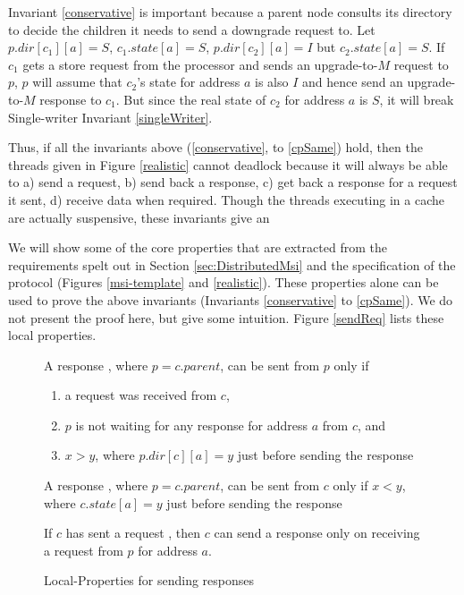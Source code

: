 Invariant \ref{conservative} is important because a parent node consults its
directory to decide the children it needs to send a downgrade request to.  Let
$p.dir[c_1][a] = S$, $c_1.state[a] = S$, $p.dir[c_2][a] = I$ but
$c_2.state[a] = S$. If $c_1$ gets a store request from the processor and sends
an upgrade-to-$M$ request to $p$, $p$ will assume that $c_2$'s state for address $a$
is also $I$ and hence send an upgrade-to-$M$ response to $c_1$. But since the real
state of  $c_2$ for address $a$ is $S$, it will break Single-writer Invariant
\ref{singleWriter}.

Thus, if all the invariants above (\ref{conservative}, to \ref{cpSame}) hold,
then the threads given in Figure \ref{realistic} cannot deadlock because it
will always be able to a) send a request, b) send back a response, c) get back
a response for a request it sent, d) receive data when required. Though the
threads executing in a cache are actually suspensive, these invariants give an

We will show some of the core properties that are extracted
from the requirements spelt out in Section \ref{sec:DistributedMsi} and the
specification of the protocol (Figures \ref{msi-template} and
\ref{realistic}). These properties alone can be used to prove the above
invariants (Invariants \ref{conservative} to \ref{cpSame}). We do not present
the proof here, but give some intuition. Figure \ref{sendReq} lists these local
properties.


\begin{figure}\small
\begin{inv}
A response , where $p = c.parent$, can be sent from $p$ only
if
\begin{enumerate}
\item a request  was received from $c$,
\item $p$ is not waiting for any response for address $a$ from $c$, and
\item $x > y$, where $p.dir[c][a] = y$ just before sending the response
\end{enumerate}
\label{pSendRespPre}
\end{inv}
\begin{inv}
A response , where $p = c.parent$, can be sent from $c$ only
if $x < y$, where $c.state[a] = y$ just before sending the
response\label{cSendRespPre1}
\end{inv}
\begin{inv}
If $c$ has sent a request , then $c$ can send a response
 only on receiving a request from $p$ for address $a$.
\label{cSendRespPre2}
\end{inv}
\caption{Local-Properties for sending responses}
\label{sendResp}
\end{figure}

